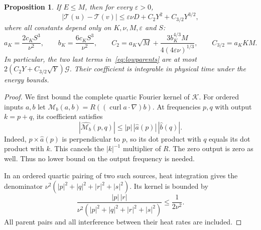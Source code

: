 \documentclass[11pt]{article}
\newtheorem{proposition}{Proposition}
\newcommand{\curl}{\operatorname{curl}}
\begin{document}
\begin{proposition}\label{prop:lowparents}
If $E\leq M$, then for every $\varepsilon>0$,
\begin{equation}\label{eq:lowparents}
 |\mathcal T(u)-\mathcal T(v)|
 \leq\varepsilon\nu D+C_2Y^2+C_{3/2}Y^{3/2},
\end{equation}
where all constants depend only on $K,\nu,M,\varepsilon$ and $S$:
\[
 a_K=\frac{2c_KS^3}{\nu^2},\qquad
 b_K=\frac{6c_KS^3}{\nu^2},\qquad
 C_2=a_K\sqrt M+\frac{3b_K^{4/3}M}{4(4\varepsilon\nu)^{1/3}},
 \qquad C_{3/2}=a_KKM.
\]
In particular, the two last terms in~\eqref{eq:lowparents} are at most
$2(C_2Y+C_{3/2}\sqrt Y)\mathcal G$. Their coefficient is integrable
in physical time under the energy bounds.
\end{proposition}
\begin{proof}
We first bound the complete quartic Fourier kernel of $\mathcal K$.
For ordered inputs $a,b$ let
$\mathcal M_b(a,b)=R((\curl a\cdot\nabla)b)$.
At frequencies $p,q$ with output $k=p+q$, its coefficient satisfies
\begin{equation}\label{eq:orderedkernel}
 |\widehat{\mathcal M_b}(p,q)|
 \leq |p|\,|\widehat a(p)|\,|\widehat b(q)|.
\end{equation}
Indeed, $p\times\widehat a(p)$ is perpendicular to $p$, so its dot
product with $q$ equals its dot product with $k$. This cancels the
$|k|^{-1}$ multiplier of $R$. The zero output is zero as well. Thus no
lower bound on the output frequency is needed.

In an ordered quartic pairing of two such sources, heat integration gives
the denominator $\nu^2(|p|^2+|q|^2+|r|^2+|s|^2)$. Its kernel is bounded by
\begin{equation}\label{eq:quartickernel}
 \frac{|p|\,|r|}{\nu^2(|p|^2+|q|^2+|r|^2+|s|^2)}
 \leq\frac1{2\nu^2}.
\end{equation}
All parent pairs and all interference between their heat rates are included.


\end{proof}
\end{document}
